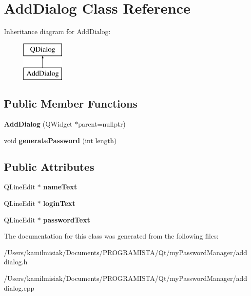 \hypertarget{class_add_dialog}{}\section{Add\+Dialog Class Reference}
\label{class_add_dialog}
Inheritance diagram for Add\+Dialog\+:\begin{figure}[H]
\begin{center}
\leavevmode
\includegraphics[height=2.000000cm]{class_add_dialog}
\end{center}
\end{figure}
\subsection*{Public Member Functions}
\begin{DoxyCompactItemize}
\item 
\mbox{\label{class_add_dialog_a4751c7ced2d3c0497b03a97018c25630}} 
{\bfseries Add\+Dialog} (Q\+Widget $\ast$parent=nullptr)
\item 
\mbox{\label{class_add_dialog_ab268c5bfd8b6a4d5fc705975fc2e1cb7}} 
void {\bfseries generate\+Password} (int length)
\end{DoxyCompactItemize}
\subsection*{Public Attributes}
\begin{DoxyCompactItemize}
\item 
\mbox{\label{class_add_dialog_ad8309ff52e361fb029ed8e779257e982}} 
Q\+Line\+Edit $\ast$ {\bfseries name\+Text}
\item 
\mbox{\label{class_add_dialog_a971833cf117e6e2bdf8d5408ae5ce2ed}} 
Q\+Line\+Edit $\ast$ {\bfseries login\+Text}
\item 
\mbox{\label{class_add_dialog_a56c03c89701e4b597180d6956ab0fb42}} 
Q\+Line\+Edit $\ast$ {\bfseries password\+Text}
\end{DoxyCompactItemize}


The documentation for this class was generated from the following files\+:\begin{DoxyCompactItemize}
\item 
/\+Users/kamilmisiak/\+Documents/\+P\+R\+O\+G\+R\+A\+M\+I\+S\+T\+A/\+Qt/my\+Password\+Manager/adddialog.\+h\item 
/\+Users/kamilmisiak/\+Documents/\+P\+R\+O\+G\+R\+A\+M\+I\+S\+T\+A/\+Qt/my\+Password\+Manager/adddialog.\+cpp\end{DoxyCompactItemize}
